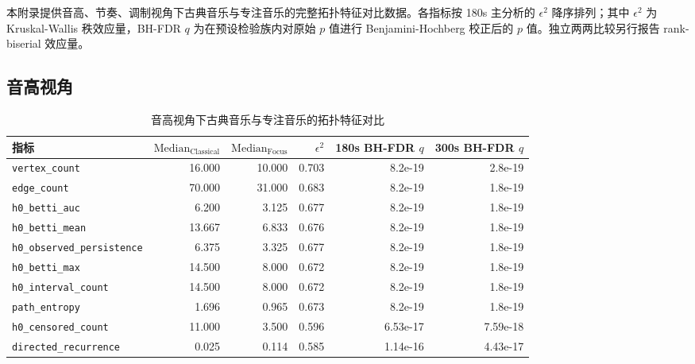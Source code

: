 \documentclass{article}
\begin{document}
本附录提供音高、节奏、调制视角下古典音乐与专注音乐的完整拓扑特征对比数据。各指标按 180s 主分析的 $\epsilon^2$ 降序排列；其中 $\epsilon^2$ 为 Kruskal-Wallis 秩效应量，BH-FDR $q$ 为在预设检验族内对原始 $p$ 值进行 Benjamini-Hochberg 校正后的 $p$ 值。独立两两比较另行报告 rank-biserial 效应量。

\subsection{音高视角}

\begin{table}[htbp]
\centering
\caption{音高视角下古典音乐与专注音乐的拓扑特征对比}
\label{tab:pitch_topology}
\begin{tabular}{lrrrrr}
\toprule
指标                    & $\text{Median}_{\text{Classical}}$ & $\text{Median}_{\text{Focus}}$ & $\epsilon^2$ & 180s BH-FDR $q$ & 300s BH-FDR $q$ \\
\midrule
\rowcolor{green!15}\verb|vertex_count|            &           16.000 &            10.000 &        0.703 &   8.2e-19 &   2.8e-19 \\
\rowcolor{green!15}\verb|edge_count|              &           70.000 &            31.000 &        0.683 &   8.2e-19 &   1.8e-19 \\
\rowcolor{green!15}\verb|h0_betti_auc|            &            6.200 &             3.125 &        0.677 &   8.2e-19 &   1.8e-19 \\
\rowcolor{green!15}\verb|h0_betti_mean|           &           13.667 &             6.833 &        0.676 &   8.2e-19 &   1.8e-19 \\
\rowcolor{green!15}\verb|h0_observed_persistence| &            6.375 &             3.325 &        0.677 &   8.2e-19 &   1.8e-19 \\
\rowcolor{green!15}\verb|h0_betti_max|            &           14.500 &             8.000 &        0.672 &   8.2e-19 &   1.8e-19 \\
\rowcolor{green!15}\verb|h0_interval_count|       &           14.500 &             8.000 &        0.672 &   8.2e-19 &   1.8e-19 \\
\rowcolor{green!15}\verb|path_entropy|            &            1.696 &             0.965 &        0.673 &   8.2e-19 &   1.8e-19 \\
\rowcolor{green!15}\verb|h0_censored_count|       &           11.000 &             3.500 &        0.596 &  6.53e-17 &  7.59e-18 \\
\rowcolor{green!15}\verb|directed_recurrence|     &            0.025 &             0.114 &        0.585 &  1.14e-16 &  4.43e-17 \\

\end{tabular}
\end{table}
\end{document}
